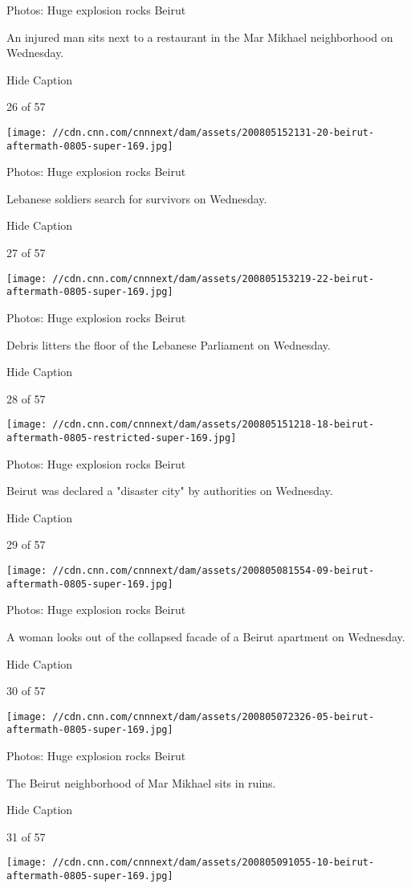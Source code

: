 Photos: Huge explosion rocks Beirut

An injured man sits next to a restaurant in the Mar Mikhael neighborhood
on Wednesday.

Hide Caption

26 of 57

\texttt{[image: //cdn.cnn.com/cnnnext/dam/assets/200805152131-20-beirut-aftermath-0805-super-169.jpg]}

Photos: Huge explosion rocks Beirut

Lebanese soldiers search for survivors on Wednesday.

Hide Caption

27 of 57

\texttt{[image: //cdn.cnn.com/cnnnext/dam/assets/200805153219-22-beirut-aftermath-0805-super-169.jpg]}

Photos: Huge explosion rocks Beirut

Debris litters the floor of the Lebanese Parliament on Wednesday.

Hide Caption

28 of 57

\texttt{[image: //cdn.cnn.com/cnnnext/dam/assets/200805151218-18-beirut-aftermath-0805-restricted-super-169.jpg]}

Photos: Huge explosion rocks Beirut

Beirut was declared a "disaster city" by authorities on Wednesday.

Hide Caption

29 of 57

\texttt{[image: //cdn.cnn.com/cnnnext/dam/assets/200805081554-09-beirut-aftermath-0805-super-169.jpg]}

Photos: Huge explosion rocks Beirut

A woman looks out of the collapsed facade of a Beirut apartment on
Wednesday.

Hide Caption

30 of 57

\texttt{[image: //cdn.cnn.com/cnnnext/dam/assets/200805072326-05-beirut-aftermath-0805-super-169.jpg]}

Photos: Huge explosion rocks Beirut

The Beirut neighborhood of Mar Mikhael sits in ruins.

Hide Caption

31 of 57

\texttt{[image: //cdn.cnn.com/cnnnext/dam/assets/200805091055-10-beirut-aftermath-0805-super-169.jpg]}

